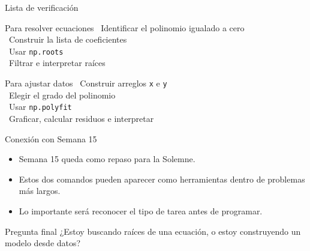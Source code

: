 \documentclass[10pt]{beamer}
\begin{document}
\begin{frame}{Lista de verificación}
  \begin{block}{Para resolver ecuaciones}
    \checkmark\ Identificar el polinomio igualado a cero\\
    \checkmark\ Construir la lista de coeficientes\\
    \checkmark\ Usar \texttt{np.roots}\\
    \checkmark\ Filtrar e interpretar raíces
  \end{block}

  \begin{block}{Para ajustar datos}
    \checkmark\ Construir arreglos \texttt{x} e \texttt{y}\\
    \checkmark\ Elegir el grado del polinomio\\
    \checkmark\ Usar \texttt{np.polyfit}\\
    \checkmark\ Graficar, calcular residuos e interpretar
  \end{block}
\end{frame}

\begin{frame}{Conexión con Semana 15}
  \begin{itemize}
    \item Semana 15 queda como repaso para la Solemne.
    \item Estos dos comandos pueden aparecer como herramientas dentro de problemas más largos.
    \item Lo importante será reconocer el tipo de tarea antes de programar.
  \end{itemize}

  \begin{alertblock}{Pregunta final}
    ¿Estoy buscando raíces de una ecuación, o estoy construyendo un modelo desde datos?
  \end{alertblock}
\end{frame}
\end{document}
